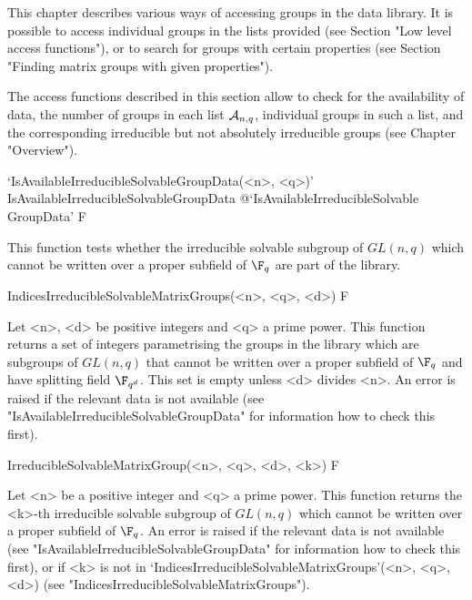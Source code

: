 


This chapter describes various ways of accessing groups in the data library.
It is possible to access individual groups in the lists provided  (see
Section  "Low level access functions"), or to search for groups with certain
properties (see Section "Finding matrix groups with given properties"). 



The access functions described in this section allow
to check for the availability of data, the number of groups in each list
${\cal A}_{n,q}$, individual groups in such a 
list, and the corresponding irreducible but not absolutely irreducible 
groups  (see Chapter "Overview").

\>`IsAvailableIrreducibleSolvableGroupData(<n>, <q>)'%
{IsAvailableIrreducibleSolvableGroupData}%
@{`IsAvailableIrreducibleSolvable\\GroupData'} F

This function tests whether the irreducible solvable subgroup of $GL(n,q)$ which
cannot be written over a proper subfield of $\F_q$ are part of the {\IRREDSOL} library.


\>IndicesIrreducibleSolvableMatrixGroups(<n>, <q>, <d>) F

Let <n>, <d> be positive integers and <q> a prime power. This
function returns a set of integers parametrising the groups in the {\IRREDSOL} library
which are subgroups of $GL(n,q)$ that cannot be written over a proper subfield of $\F_q$
and have splitting field $\F_{q^d}$. This set is empty unless <d> divides <n>. An error is raised if the relevant
data is not available (see "IsAvailableIrreducibleSolvableGroupData" for information 
how to check this first).


\>IrreducibleSolvableMatrixGroup(<n>, <q>, <d>, <k>) F

Let <n> be a  positive integer and <q> a prime power. This
function returns the <k>-th irreducible solvable subgroup of $GL(n,q)$ which
cannot be written over a proper subfield of $\F_q$. 
An error is raised if the relevant
data is not available (see "IsAvailableIrreducibleSolvableGroupData" for information 
how to check this first), or if <k> is not in  
`IndicesIrreducibleSolvableMatrixGroups'(<n>, <q>, <d>) 
(see "IndicesIrreducibleSolvableMatrixGroups").



